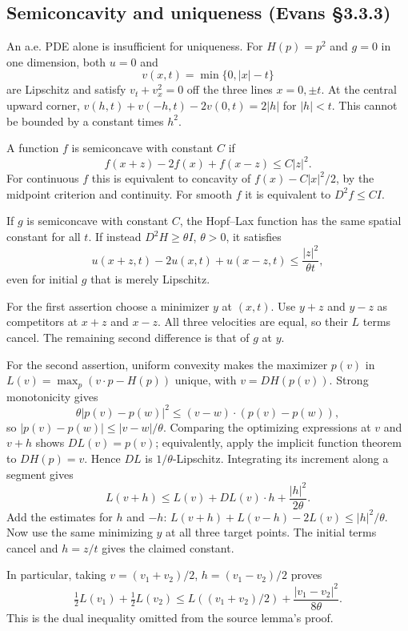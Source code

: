 \subsection{Semiconcavity and uniqueness (Evans \S3.3.3)}
\label{sec:3-semiconcavity}
An a.e. PDE alone is insufficient for uniqueness.
For $H(p)=p^2$ and $g=0$ in one dimension, both $u=0$ and
\[
 v(x,t)=\min\{0,|x|-t\}
\]
are Lipschitz and satisfy $v_t+v_x^2=0$ off the three lines
$x=0,\pm t$. At the central upward corner,
$v(h,t)+v(-h,t)-2v(0,t)=2|h|$ for $|h|<t$.
This cannot be bounded by a constant times $h^2$.

\begin{definition}
A function $f$ is semiconcave with constant $C$ if
\[
 f(x+z)-2f(x)+f(x-z)\leq C|z|^2 .
\]
For continuous $f$ this is equivalent to concavity of
$f(x)-C|x|^2/2$, by the midpoint criterion and continuity.
For smooth $f$ it is equivalent to $D^2f\leq CI$.
\end{definition}
\Needspace{45mm}

\begin{theorem}
If $g$ is semiconcave with constant $C$, the Hopf--Lax function has
the same spatial constant for all $t$.
If instead $D^2H\geq\theta I$, $\theta>0$, it satisfies
\[
 u(x+z,t)-2u(x,t)+u(x-z,t)\leq\frac{|z|^2}{\theta t},
\]
even for initial $g$ that is merely Lipschitz.
\end{theorem}
\begin{expandedproof}
For the first assertion choose a minimizer $y$ at $(x,t)$.
Use $y+z$ and $y-z$ as competitors at $x+z$ and $x-z$.
All three velocities are equal, so their $L$ terms cancel.
The remaining second difference is that of $g$ at $y$.

For the second assertion, uniform convexity makes the maximizer $p(v)$
in $L(v)=\max_p(v\cdot p-H(p))$ unique, with $v=DH(p(v))$.
Strong monotonicity gives
\[
 \theta|p(v)-p(w)|^2
 \leq (v-w)\cdot(p(v)-p(w)),
\]
so $|p(v)-p(w)|\leq|v-w|/\theta$.
Comparing the optimizing expressions at $v$ and $v+h$ shows
$DL(v)=p(v)$; equivalently, apply the implicit function theorem
to $DH(p)=v$. Hence $DL$ is $1/\theta$-Lipschitz.
Integrating its increment along a segment gives
\[
 L(v+h)\leq L(v)+DL(v)\cdot h+\frac{|h|^2}{2\theta}.
\]
Add the estimates for $h$ and $-h$:
$L(v+h)+L(v-h)-2L(v)\leq|h|^2/\theta$.
Now use the same minimizing $y$ at all three target points.
The initial terms cancel and $h=z/t$ gives the claimed constant.

In particular, taking $v=(v_1+v_2)/2$, $h=(v_1-v_2)/2$ proves
\[
 \tfrac12L(v_1)+\tfrac12L(v_2)
 \leq L((v_1+v_2)/2)+\frac{|v_1-v_2|^2}{8\theta}.
\]
This is the dual inequality omitted from the source lemma's proof.
\end{expandedproof}

